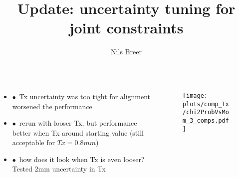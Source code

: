 \documentclass[aspectratio=1610, 12pt]{beamer}
\title{Update: uncertainty tuning for joint constraints}
\author[N.Breer]{Nils Breer}
\institute{TU Dortmund, AG Albrecht}
\begin{document}
\maketitle


\begin{frame}
  \begin{columns}
    \begin{column}[c]{0.48\textwidth}
      \begin{itemize}
        \item $\bullet$\, Tx uncertainty was too tight for alignment \to worsened the performance
        \item $\bullet$\, rerun with looser Tx, but performance better when Tx around starting value (still acceptable for $Tx = 0.8mm$)
        \item $\bullet$\, how does it look when Tx is even looser? Tested 2mm uncertainty in Tx
      \end{itemize}
    \end{column}
      \begin{column}[c]{0.48\textwidth}
        \begin{figure}
          \texttt{[image: plots/comp\_Tx/chi2ProbVsMom\_3\_comps.pdf]}
        \end{figure}
      \end{column}
  \end{columns}
\end{frame}
\end{document}

